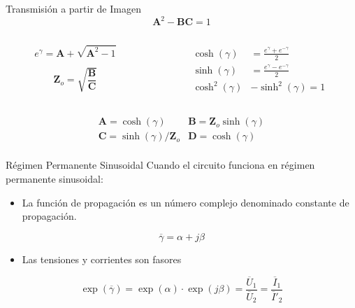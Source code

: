 \documentclass[aspectratio=169, usenames,svgnames,dvipsnames]{beamer}
\begin{document}
\begin{frame}[label={sec:orgc31b78c}]{Transmisión a partir de Imagen}
\[
\mathbf{A}^2 - \mathbf{B}\mathbf{C} = 1
\]

\begin{columns}
\begin{column}{0.33\columnwidth}
\[
  e^\gamma = \mathbf{A} + \sqrt{\mathbf{A}^2 - 1}
\]

\[
  \mathbf{Z}_o = \sqrt{\frac{\mathbf{B}}{\mathbf{C}}}
\]
\end{column}

\begin{column}{0.33\columnwidth}
\begin{align*}
  \cosh(\gamma) &= \frac{e^\gamma + e^{-\gamma}}{2}\\
  \sinh(\gamma) &= \frac{e^\gamma - e^{-\gamma}}{2}\\
  \cosh^2(\gamma) &- \sinh^2(\gamma) = 1
\end{align*}
\end{column}
\end{columns}

\vspace{1cm}
\[
\boxed{
  \begin{array}{ll}
    \mathbf{A} = \cosh(\gamma) &
    \mathbf{B} = \mathbf{Z}_o \sinh(\gamma)\\
    \mathbf{C} = \sinh(\gamma)/\mathbf{Z}_o &
    \mathbf{D} = \cosh(\gamma)\\
  \end{array}
}
\]
\end{frame}

\begin{frame}[label={sec:orgcda7d73}]{Régimen Permanente Sinusoidal}
Cuando el circuito funciona en régimen permanente sinusoidal:

\begin{itemize}
\item La función de propagación es un número complejo denominado constante de propagación.
\end{itemize}
\[
  \overline{\gamma} = \alpha + j\beta
\]
\begin{itemize}
\item Las tensiones y corrientes son fasores
\end{itemize}
\[
  \exp(\overline{\gamma}) = \exp(\alpha) \cdot \exp(j\beta) = \frac{\overline{U}_1}{\overline{U}_2} = \frac{\overline{I}_1}{\overline{I}'_2}
\]
\end{frame}
\end{document}
